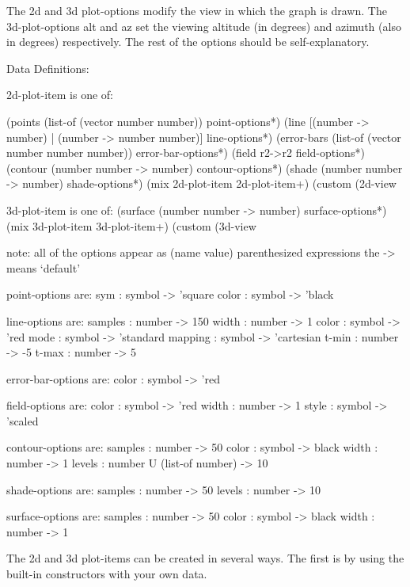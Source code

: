 \documentclass{article}
\begin{document}
{\begin{schemedisplay}
\end{schemedisplay}



The 2d and 3d plot-options modify the view in which the graph is drawn. The 3d-plot-options alt and az set the viewing altitude (in degrees) and azimuth (also in degrees) respectively. The rest of the options should be self-explanatory.



\begin{schemedisplay}
Data Definitions:
     
2d-plot-item is one of:

 (points (list-of (vector number number)) point-options*)
 (line [(number -> number) | (number -> number number)] line-options*)
 (error-bars (list-of (vector number number number)) error-bar-options*)
 (field r2->r2 field-options*)
 (contour (number number -> number) contour-options*)
 (shade (number number -> number) shade-options*)
 (mix 2d-plot-item 2d-plot-item+)
 (custom (2d-view%
     
3d-plot-item is one of:
 (surface (number number -> number) surface-options*)
 (mix 3d-plot-item 3d-plot-item+)
 (custom (3d-view%

note: all of the options appear as (name value) parenthesized expressions
the -> means `default'

point-options are:
 sym : symbol -> 'square
 color : symbol -> 'black

line-options are:
 samples : number -> 150
 width : number -> 1
 color : symbol -> 'red
 mode : symbol -> 'standard
 mapping : symbol -> 'cartesian
 t-min : number -> -5
 t-max : number -> 5
 
error-bar-options are:
 color : symbol -> 'red

field-options are:
 color : symbol -> 'red
 width : number -> 1
 style : symbol -> 'scaled

contour-options are:
 samples : number -> 50
 color : symbol -> black
 width : number -> 1
 levels : number U (list-of number) -> 10

shade-options are:
 samples : number -> 50
 levels : number -> 10

surface-options are:
 samples : number -> 50
 color : symbol -> black
 width : number -> 1
\end{schemedisplay}



The 2d and 3d plot-items can be created in several ways. The first is by using the built-in constructors with your own data. 


}
\end{document}
